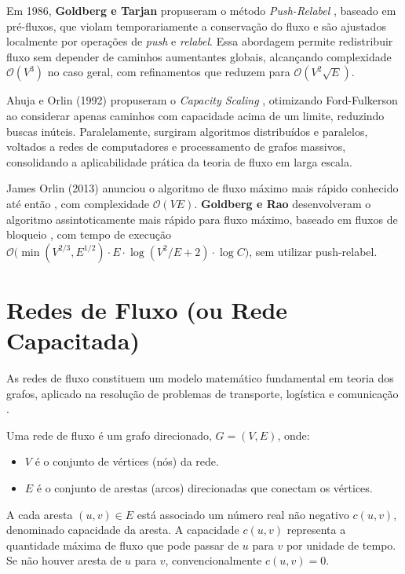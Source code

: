 \documentclass[12pt]{article}
\begin{document}
Em 1986, \textbf{Goldberg e Tarjan} propuseram o método \textit{Push-Relabel} \cite{goldberg1988}, baseado em pré-fluxos, que violam temporariamente a conservação do fluxo e são ajustados localmente por operações de \textit{push} e \textit{relabel}. Essa abordagem permite redistribuir fluxo sem depender de caminhos aumentantes globais, alcançando complexidade $\mathcal{O}(V^3)$ no caso geral, com refinamentos que reduzem para $\mathcal{O}(V^2 \sqrt{E})$.

Ahuja e Orlin (1992) propuseram o \textit{Capacity Scaling} \cite{ahuja1993}, otimizando Ford-Fulkerson ao considerar apenas caminhos com capacidade acima de um limite, reduzindo buscas inúteis. Paralelamente, surgiram algoritmos distribuídos e paralelos, voltados a redes de computadores e processamento de grafos massivos, consolidando a aplicabilidade prática da teoria de fluxo em larga escala.

James Orlin (2013) anunciou o algoritmo de fluxo máximo mais rápido conhecido até então \cite{orlin2013}, com complexidade $\mathcal{O}(VE)$. \textbf{Goldberg e Rao} desenvolveram o algoritmo assintoticamente mais rápido para fluxo máximo, baseado em fluxos de bloqueio \cite{goldberg1998}, com tempo de execução $\mathcal{O}\big(\min(V^{2/3}, E^{1/2}) \cdot E \cdot \log(V^2/E + 2) \cdot \log C \big)$, sem utilizar push-relabel.

\newpage
\section{Redes de Fluxo (ou Rede Capacitada)} 

As redes de fluxo constituem um modelo matemático fundamental em teoria dos grafos, aplicado na resolução de problemas de transporte, logística e comunicação \cite{ahuja1993,cormen2009}.

Uma rede de fluxo é um grafo direcionado, $G = (V, E)$, onde:

\begin{itemize}
    \item $V$ é o conjunto de vértices (nós) da rede.
    \item $E$ é o conjunto de arestas (arcos) direcionadas que conectam os vértices.
\end{itemize}

\noindent A cada aresta $(u, v) \in E$ está associado um número real não negativo $c(u, v)$, denominado capacidade da aresta. A capacidade $c(u, v)$ representa a quantidade máxima de fluxo que pode passar de $u$ para $v$ por unidade de tempo. Se não houver aresta de $u$ para $v$, convencionalmente $c(u, v) = 0$.
\end{document}
